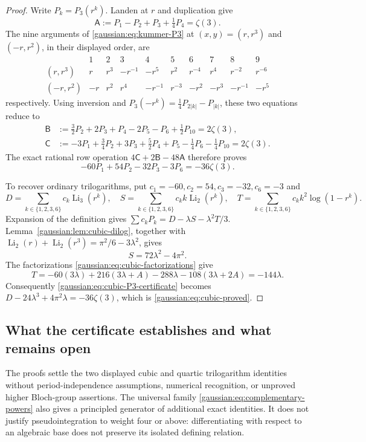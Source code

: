 \begin{proof}
Write $P_k=P_3(r^k)$. Landen at $r$ and duplication give
\[
\mathsf A:=P_1-P_2+P_3+\tfrac14P_4=\zeta(3).
\]
The nine arguments of \eqref{gaussian:eq:kummer-P3} at
$(x,y)=(r,r^3)$ and $(-r,r^2)$, in their displayed order, are
\[
\begin{array}{c|rrrrrrrrr}
 &1&2&3&4&5&6&7&8&9\\ \hline
(r,r^3)&r&r^3&-r^{-1}&-r^5&r^2&r^{-4}&r^4&r^{-2}&r^{-6}\\
(-r,r^2)&-r&r^2&r^4&-r^{-1}&r^{-3}&-r^2&-r^3&-r^{-1}&-r^5
\end{array}
\]
respectively. Using inversion and
$P_3(-r^k)=\tfrac14P_{2|k|}-P_{|k|}$, these two equations reduce to
\begin{align*}
\mathsf B&:=\tfrac32P_2+2P_3+P_4-2P_5-P_6+\tfrac12P_{10}
 =2\zeta(3),\\
\mathsf C&:=-3P_1+\tfrac34P_2+3P_3+\tfrac52P_4+P_5
 -\tfrac14P_6-\tfrac14P_{10}=2\zeta(3).
\end{align*}
The exact rational row operation $4\mathsf C+2\mathsf B-48\mathsf A$
therefore proves
\begin{equation}
-60P_1+54P_2-32P_3-3P_6=-36\zeta(3).
\label{gaussian:eq:cubic-P3-certificate}
\end{equation}

To recover ordinary trilogarithms, put
$c_1=-60,c_2=54,c_3=-32,c_6=-3$ and
\[
D=\sum_{k\in\{1,2,3,6\}}c_k\operatorname{Li}_3(r^k),\quad
S=\sum_{k\in\{1,2,3,6\}}c_k k\operatorname{Li}_2(r^k),\quad
T=\sum_{k\in\{1,2,3,6\}}c_k k^2\log(1-r^k).
\]
Expansion of the definition gives
$\sum c_kP_k=D-\lambda S-\lambda^2 T/3$.
Lemma~\ref{gaussian:lem:cubic-dilog}, together with
$\operatorname{Li}_2(r)+\operatorname{Li}_2(r^3)
=\pi^2/6-3\lambda^2$, gives
\[
S=72\lambda^2-4\pi^2.
\]
The factorizations \eqref{gaussian:eq:cubic-factorizations} give
\[
T=-60(3\lambda)+216(3\lambda+A)
 -288\lambda-108(3\lambda+2A)=-144\lambda.
\]
Consequently \eqref{gaussian:eq:cubic-P3-certificate} becomes
$D-24\lambda^3+4\pi^2\lambda=-36\zeta(3)$, which is
\eqref{gaussian:eq:cubic-proved}.
\end{proof}

\subsection{What the certificate establishes and what remains open}

The proofs settle the two displayed cubic and quartic trilogarithm
identities without period-independence assumptions, numerical recognition,
or unproved higher Bloch-group assertions. The universal family
\eqref{gaussian:eq:complementary-powers} also gives a principled generator of
additional exact identities. It does not justify pseudointegration to
weight four or above: differentiating with respect to an algebraic base
does not preserve its isolated defining relation.

